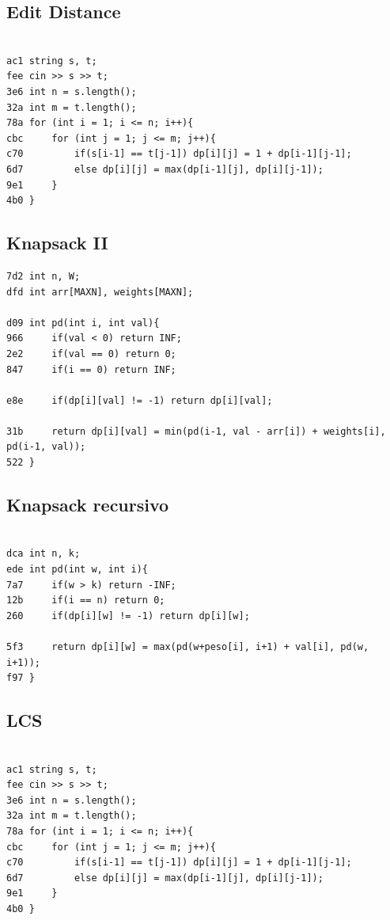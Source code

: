 \documentclass[11pt, a4paper, twoside]{article}
\begin{document}
\subsection{Edit Distance}
\begin{lstlisting}

ac1 string s, t;
fee cin >> s >> t;
3e6 int n = s.length();
32a int m = t.length();
78a for (int i = 1; i <= n; i++){
cbc     for (int j = 1; j <= m; j++){
c70         if(s[i-1] == t[j-1]) dp[i][j] = 1 + dp[i-1][j-1];
6d7         else dp[i][j] = max(dp[i-1][j], dp[i][j-1]);
9e1     }
4b0 }
\end{lstlisting}

\subsection{Knapsack II}
\begin{lstlisting}
7d2 int n, W;
dfd int arr[MAXN], weights[MAXN];

d09 int pd(int i, int val){
966     if(val < 0) return INF;
2e2     if(val == 0) return 0;
847     if(i == 0) return INF;
    
e8e     if(dp[i][val] != -1) return dp[i][val];
    
31b     return dp[i][val] = min(pd(i-1, val - arr[i]) + weights[i], pd(i-1, val));
522 }
\end{lstlisting}

\subsection{Knapsack recursivo}
\begin{lstlisting}

dca int n, k;
ede int pd(int w, int i){
7a7     if(w > k) return -INF;
12b     if(i == n) return 0;
260     if(dp[i][w] != -1) return dp[i][w];
    
5f3     return dp[i][w] = max(pd(w+peso[i], i+1) + val[i], pd(w, i+1));
f97 }
\end{lstlisting}

\subsection{LCS}
\begin{lstlisting}

ac1 string s, t;
fee cin >> s >> t;
3e6 int n = s.length();
32a int m = t.length();
78a for (int i = 1; i <= n; i++){
cbc     for (int j = 1; j <= m; j++){
c70         if(s[i-1] == t[j-1]) dp[i][j] = 1 + dp[i-1][j-1];
6d7         else dp[i][j] = max(dp[i-1][j], dp[i][j-1]);
9e1     }
4b0 }
\end{lstlisting}
\end{document}
